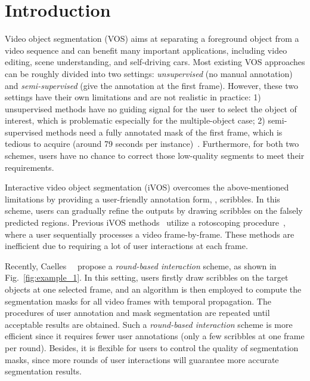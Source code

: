 \documentclass[10pt,twocolumn,letterpaper]{article}
\begin{document}
\section{Introduction}
Video object segmentation (VOS) aims at separating a foreground object from a video sequence and can benefit many important applications, including video editing, scene understanding, and self-driving cars. Most existing VOS approaches can be roughly divided into two settings: \emph{unsupervised} (no manual annotation) and \emph{semi-supervised} (give the annotation at the first frame). However, these two settings have their own limitations and are not realistic in practice: 1) unsupervised methods have no guiding signal for the user to select the object of interest, which is problematic especially for the multiple-object case; 2) semi-supervised methods need a fully annotated mask of the first frame, which is tedious to acquire (around 79 seconds per instance)~\cite{caelles20182018}. Furthermore, for both two schemes, users have no chance to correct those low-quality segments to meet their requirements.

Interactive video object segmentation (iVOS) overcomes the above-mentioned limitations by providing a user-friendly annotation form, \eg, scribbles. In this scheme, users can gradually refine the outputs by drawing scribbles on the falsely predicted regions. Previous iVOS methods~\cite{wang2005interactive,price2009livecut,bai2009video} utilize a rotoscoping procedure~\cite{bratt2012rotoscoping,li2016roto++}, where a user sequentially processes a video frame-by-frame. These methods are inefficient due to requiring a lot of user interactions at each frame.

Recently, Caelles~\etal~\cite{caelles20182018} propose a \emph{round-based interaction} scheme, as shown in Fig.~\ref{fig:example_1}. In this setting, users firstly draw scribbles on the target objects at one selected frame, and an algorithm is then employed to compute the segmentation masks for all video frames with temporal propagation. The procedures of user annotation and mask segmentation are repeated until acceptable results are obtained. Such a \emph{round-based interaction} scheme is more efficient since it requires fewer user annotations (only a few scribbles at one frame per round). Besides, it is flexible for users to control the quality of segmentation masks, since more rounds of user interactions will guarantee more accurate segmentation results. 
\end{document}
